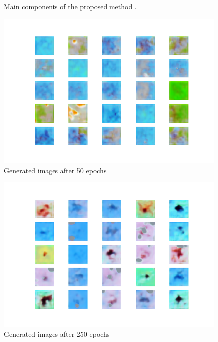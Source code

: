 \begin{figure}[h]
\caption{Main components of the proposed method .}
\label{fig:gen50}
\begin{center}
\includegraphics[scale=0.45]{./images/generation/alta_mnist_50.png} \end{center}\caption{Generated images after 50 epochs}
\end{figure}

\begin{figure}[h]
\caption{Generated images after 250 epochs}
\label{fig:gen250}
\begin{center}
\includegraphics[scale=0.45]{./images/generation/alta_mnist_250.png} \end{center}

\end{figure}



